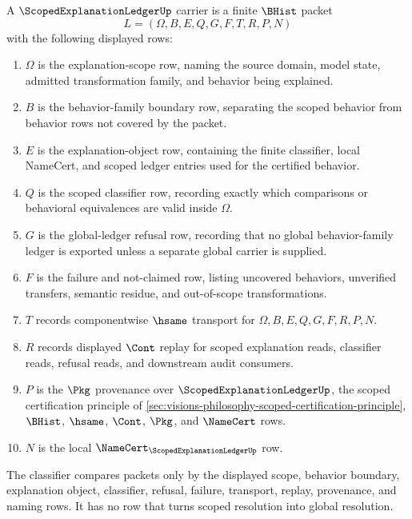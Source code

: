 \begin{definition}
\label{def:scoped-explanation-ledger-carrier}
A $\ScopedExplanationLedgerUp$ carrier is a finite $\BHist$ packet
$$
L=(\Omega,B,E,Q,G,F,T,R,P,N)
$$
with the following displayed rows:
\begin{enumerate}
\item $\Omega$ is the explanation-scope row, naming the source domain, model state, admitted transformation family, and behavior being explained.
\item $B$ is the behavior-family boundary row, separating the scoped behavior from behavior rows not covered by the packet.
\item $E$ is the explanation-object row, containing the finite classifier, local NameCert, and scoped ledger entries used for the certified behavior.
\item $Q$ is the scoped classifier row, recording exactly which comparisons or behavioral equivalences are valid inside $\Omega$.
\item $G$ is the global-ledger refusal row, recording that no global behavior-family ledger is exported unless a separate global carrier is supplied.
\item $F$ is the failure and not-claimed row, listing uncovered behaviors, unverified transfers, semantic residue, and out-of-scope transformations.
\item $T$ records componentwise $\hsame$ transport for $\Omega,B,E,Q,G,F,R,P,N$.
\item $R$ records displayed $\Cont$ replay for scoped explanation reads, classifier reads, refusal reads, and downstream audit consumers.
\item $P$ is the $\Pkg$ provenance over $\ScopedExplanationLedgerUp$, the scoped certification principle of \autoref{sec:visions-philosophy-scoped-certification-principle}, $\BHist$, $\hsame$, $\Cont$, $\Pkg$, and $\NameCert$ rows.
\item $N$ is the local $\NameCert_{\ScopedExplanationLedgerUp}$ row.
\end{enumerate}
The classifier compares packets only by the displayed scope, behavior boundary, explanation object, classifier, refusal, failure, transport, replay, provenance, and naming rows. It has no row that turns scoped resolution into global resolution.
\end{definition}

